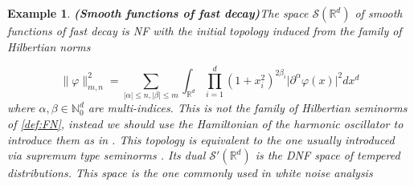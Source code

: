 \documentclass{elsarticle}%
\newtheorem{example}{Example}%
\begin{document}
\begin{example}{\bf (Smooth functions of fast decay)}\label{ex:schwartFunctions} The space $\mathcal{S}(\mathbb{R}^d)$ of smooth functions of fast decay is NF  with the initial topology induced from the family of Hilbertian norms

    \begin{equation}
        \label{eq:hilbertianNormsSchwartz}
        \lVert\varphi\rVert_{m,n}^2=\sum_{\lvert\alpha\rvert\leq n, \lvert\beta\rvert\leq m}\int_{\mathbb{R}^d}\prod_{i=1}^d(1+x_i^2)^{2\beta_i}\lvert \partial^\alpha\varphi(x)\rvert^2 dx^d
    \end{equation}
    where $\alpha,\beta\in \mathbb{N}_0^d$ are multi-indices. This is not the family of Hilbertian seminorms of  \autoref{def:FN}, instead we should use the Hamiltonian of the harmonic oscillator to introduce them as in \cite{hidaWhiteNoise1993}. This topology is equivalent to the one usually introduced via supremum type seminorms \cite{hidaBrownianMotion1980}. Its dual $\mathcal{S}'(\mathbb{R}^d)$ is the DNF space of tempered distributions. This space is the one commonly used in white noise analysis \cite{hidaWhiteNoise1993}  
\end{example}
\end{document}

